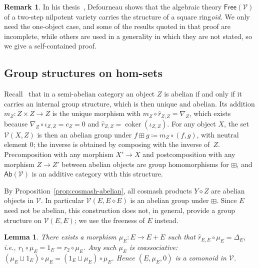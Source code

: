 \documentclass[reqno,a4paper]{amsart}
\theoremstyle{plain}
\newtheorem{lemma}[subsection]{Lemma}
\theoremstyle{definition}
\newtheorem{remark}[subsection]{Remark}
\newcommand{\DefEq}{\coloneq}
\newcommand{\V}{\ensuremath{\mathcal{V}}}
\newcommand{\Ab}{\ensuremath{\mathsf{Ab}}}
\newcommand{\Free}{\ensuremath{\mathsf{Free}}}
\DeclareMathOperator{\coker}{coker}
\newcommand{\cosmash}{\ensuremath{\diamond}}
\newcommand{\cosum}{\ensuremath{\sqcup}}                   %
\newcommand{\cm}[2]{\ensuremath{\hat{r}_{#1,#2}}}          %
\newcommand{\cc}[1]{\ensuremath{c_{#1}}}                    %
\newcommand{\fold}[1]{\ensuremath{\nabla_{#1}}}            %
\newcommand{\diag}[1]{\ensuremath{\Delta_{#1}}}            %
\begin{document}
\begin{remark}\label{rem:defourneau}
  In his thesis~\cite[Proposition~4.1.24]{Defourneau}, Defourneau shows that the algebraic theory \(\Free(\V)\) of a two-step nilpotent variety carries the structure of a square ring\emph{oid}. We only need the one-object case, and some of the results quoted in that proof are incomplete, while others are used in a generality in which they are not stated, so we give a self-contained proof.
\end{remark}

\subsection{Group structures on hom-sets}\label{sec:hom-groups}
Recall~\cite{Borceux-Bourn} that in a semi-abelian category an object \(Z\) is abelian if and only if it carries an internal group structure, which is then unique and abelian. Its addition \(m_{Z}\colon Z\times Z\to Z\) is the unique morphism with \(m_{Z}\circ\cm{Z}{Z}=\fold{Z}\), which exists because \(\fold{Z}\circ\iota_{Z,Z}=\cc{Z}=0\) and \(\cm{Z}{Z}=\coker(\iota_{Z,Z})\). For any object \(X\), the set \(\V(X,Z)\) is then an abelian group under \(f\boxplus g\DefEq m_{Z}\circ(f,g)\), with neutral element \(0\); the inverse is obtained by composing with the inverse of~\(Z\). Precomposition with any morphism \(X'\to X\) and postcomposition with any morphism \(Z\to Z'\) between abelian objects are group homomorphisms for \(\boxplus\), and \(\Ab(\V)\) is an additive category with this structure.

By Proposition~\ref{prop:cosmash-abelian}, all cosmash products \(Y\cosmash Z\) are abelian objects in \(\V\). In particular \(\V(E,E\cosmash E)\) is an abelian group under \(\boxplus\). Since \(E\) need not be abelian, this construction does not, in general, provide a group structure on \(\V(E,E)\); we use the freeness of \(E\) instead.

\begin{lemma}\label{lem:comonoid}
  There exists a morphism \(\mu_{E}\colon E\to E+E\) such that \(\cm{E}{E}\circ\mu_{E}=\diag{E}\), i.e., \(r_{1}\circ\mu_{E}=1_{E}=r_{2}\circ\mu_{E}\). Any such \(\mu_{E}\) is coassociative: \((\mu_{E}\cosum 1_{E})\circ\mu_{E}=(1_{E}\cosum\mu_{E})\circ\mu_{E}\). Hence \((E,\mu_{E},0)\) is a comonoid in \(\V\).
\end{lemma}
\end{document}
